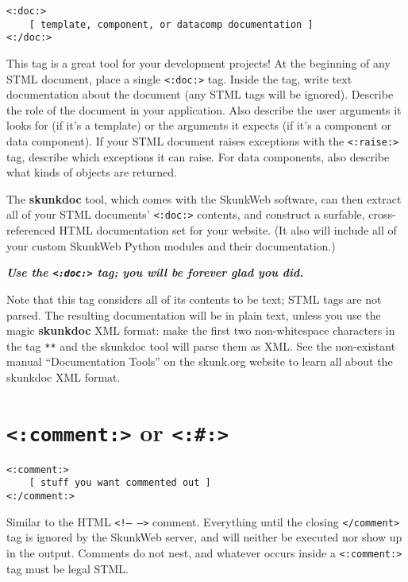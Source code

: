 \documentclass{manual}
\begin{document}
\begin{verbatim}<:doc:>
    [ template, component, or datacomp documentation ]
<:/doc:>
\end{verbatim}


This tag is a great tool for your development projects!
At the beginning of any STML document,
place a single \texttt{<:doc:>} tag. Inside the tag,
write text documentation about the document (any STML tags will
be ignored). Describe the role of the document in your application.
Also describe the user arguments it looks for (if it's a template)
or the arguments it expects (if it's a component or data component).
If your STML document raises exceptions with the \texttt{<:raise:>}
tag, describe which exceptions it can raise.
For data components, also describe what kinds of objects are returned.

The \textbf{skunkdoc} tool, which comes with the SkunkWeb software, can
then extract all of your STML documents' \texttt{<:doc:>} 
contents, and construct a surfable, cross-referenced HTML
documentation set for your website. (It also will include all of
your custom SkunkWeb Python modules and their documentation.)

\textbf{\emph{Use the \texttt{<:doc:>}
tag; you will be forever glad you did.}}

Note that this tag considers all of its contents to be text; STML tags
are not parsed. The resulting documentation will be in plain text, unless
you use the magic \textbf{skunkdoc} XML format: make the first two
non-whitespace characters in the tag \texttt{**} and the skunkdoc tool
will parse them as XML. See the non-existant 
manual ``Documentation Tools'' on the skunk.org
website to learn all about the skunkdoc XML format.


\section{\texttt{<:comment:>} or \texttt{<:\#:>}}
\label{tagcomment}

\begin{verbatim}
<:comment:>
    [ stuff you want commented out ]
<:/comment:>
\end{verbatim}

Similar to the HTML \texttt{<!-- -->} comment. Everything until
the closing \texttt{</comment>} tag is ignored by the SkunkWeb server,
and will neither be executed nor show up in the output. 
Comments do not nest,
and whatever occurs inside a \texttt{<:comment:>} tag must
be legal STML. 
\end{document}
